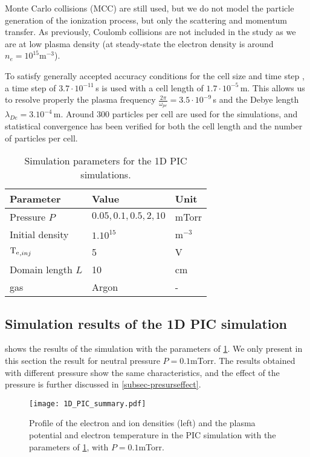     Monte Carlo collisions (MCC) are still used, but we do not model the particle generation of the ionization process, but only the scattering and momentum transfer.
    As previously, Coulomb collisions are not included in the study as we are at low plasma density (at steady-state the electron density is around $n_e = 10^{15}$m$^{-3}$).

    To satisfy generally accepted accuracy conditions for the cell size and time step \citep{turner2013}, a time step of $3.7\cdot10^{-11}$\,s is used with a cell length of $1.7\cdot10^{-5}$\,m.
    This allows us to resolve properly the plasma frequency $\frac{2 \pi}{\omega_{pe}} = 3.5\cdot10^{-9} $\,s and the Debye length $\lambda_{De} = 3.10^{-4}$\,m.
    Around $300$ particles per cell are used for the simulations, and statistical convergence has been verified for both the cell length and the number of particles per cell.


    \begin{table}
      \centering
      \begin{tabular}{lll}  \toprule
        Parameter & Value & Unit  \\ \midrule
        Pressure $P$ & $0.05,0.1,0.5, 2, 10$ & mTorr\\
        Initial density & $1 .10^{15}$ & m$^{-3}$\\
        $\mathrm{T_e}_{, inj}$& 5 & V\\
        Domain length $L$ & 10 & cm\\
        gas & Argon & -\\
        \bottomrule
      \end{tabular}
      \caption{Simulation parameters for the 1D PIC simulations.}
      \label{tab_1DPICParams}
    \end{table}


  \subsection{Simulation results of the \acs{1D} \acs{PIC} simulation} \label{subsec-1DPIC_results}

     shows the results of the simulation with the parameters of \cref{tab_1DPICParams}.
    We only present in this section the result for neutral pressure $P=0.1$mTorr.
    The results obtained with different pressure show the same characteristics, and the effect of the pressure is further discussed in \cref{subsec-presurseffect}.
    
    \begin{figure}[!htb]
      \centering
      \texttt{[image: 1D\_PIC\_summary.pdf]}
      \caption{Profile of the electron and ion densities (left) and the plasma potential and electron temperature in the PIC simulation with the parameters of \cref{tab_1DPICParams}, with $P=0.1$mTorr.}
      \label{fig-PIC1}
    \end{figure}



